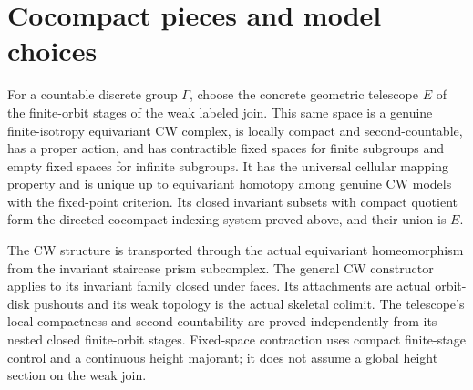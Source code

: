 \section{Cocompact pieces and model choices}
\begin{definition}\label{def:cocompact-pieces}
\leanok
For a countable discrete group $\Gamma$, choose the concrete geometric
telescope $E$ of the finite-orbit stages of the weak labeled join.
This same space is a genuine finite-isotropy equivariant CW complex,
is locally compact and second-countable, has a proper action, and has
contractible fixed spaces for finite subgroups and empty fixed spaces
for infinite subgroups. It has the universal cellular mapping property
and is unique up to equivariant homotopy among genuine CW models with
the fixed-point criterion. Its closed invariant subsets with compact
quotient form the directed cocompact indexing system proved above,
and their union is $E$.
\end{definition}

The CW structure is transported through the actual equivariant
homeomorphism from the invariant staircase prism subcomplex. The general
CW constructor applies to its invariant family closed under faces. Its
attachments are actual orbit-disk pushouts and its weak topology is
the actual skeletal colimit. The telescope's local compactness and
second countability are proved independently from its nested closed
finite-orbit stages. Fixed-space contraction uses compact finite-stage
control and a continuous height majorant; it does not assume a global
height section on the weak join.
